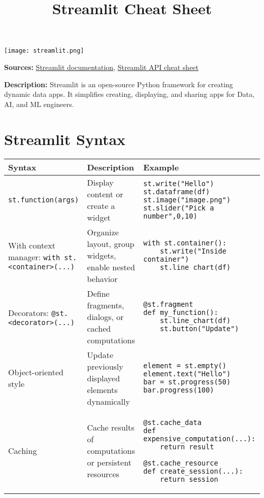 \documentclass[11pt,a4paper]{article}
\title{Streamlit Cheat Sheet}
\author{}
\date{}
\begin{document}
\maketitle

\begin{center}
\texttt{[image: streamlit.png]}
\end{center}

\textbf{Sources:} \href{https://docs.streamlit.io/#}{Streamlit documentation}, \href{https://docs.streamlit.io/develop/quick-reference/cheat-sheet}{Streamlit API cheat sheet}

\textbf{Description:} Streamlit is an open-source Python framework for creating dynamic data apps. It simplifies creating, displaying, and sharing apps for Data, AI, and ML engineers.

\section*{Streamlit Syntax}
\begin{longtable}{|L{4cm}|L{6cm}|L{6cm}|}
\hline
\textbf{Syntax} & \textbf{Description} & \textbf{Example} \\ \hline
\verb|st.function(args)| & Display content or create a widget & 
\verb|st.write("Hello")| \newline
\verb|st.dataframe(df)| \newline
\verb|st.image("image.png")| \newline
\verb|st.slider("Pick a number",0,10)| \\ \hline

With context manager: \verb|with st.<container>(...)| & Organize layout, group widgets, enable nested behavior & 
\begin{lstlisting}
with st.container():
    st.write("Inside container")
    st.line_chart(df)
\end{lstlisting} \\ \hline

Decorators: \verb|@st.<decorator>(...)| & Define fragments, dialogs, or cached computations &
\begin{lstlisting}
@st.fragment
def my_function():
    st.line_chart(df)
    st.button("Update")
\end{lstlisting} \\ \hline

Object-oriented style & Update previously displayed elements dynamically &
\begin{lstlisting}
element = st.empty()
element.text("Hello")
bar = st.progress(50)
bar.progress(100)
\end{lstlisting} \\ \hline

Caching & Cache results of computations or persistent resources &
\begin{lstlisting}
@st.cache_data
def expensive_computation(...):
    return result

@st.cache_resource
def create_session(...):
    return session
\end{lstlisting} \\ \hline
\end{longtable}
\end{document}
